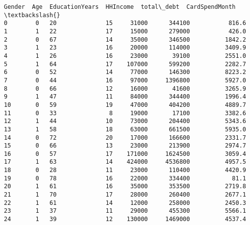 \documentclass[11pt]{article}
\begin{document}
    \begin{Verbatim}[commandchars=\\\{\}]
    Gender  Age  EducationYears  HHIncome  total\_debt  CardSpendMonth  \textbackslash{}
0        0   20              15     31000      344100           816.6
1        1   22              17     15000      279000           426.0
2        0   67              14     35000      346500          1842.2
3        1   23              16     20000      114000          3409.9
4        1   26              16     23000       39100          2551.0
5        1   64              17    107000      599200          2282.7
6        0   52              14     77000      146300          8223.2
7        0   44              16     97000     1396800          5927.0
8        0   66              12     16000       41600          3265.9
9        1   47              11     84000      344400          1996.4
10       0   59              19     47000      404200          4889.7
11       0   33               8     19000       17100          3382.6
12       1   44              10     73000      204400          5343.6
13       1   58              18     63000      661500          5935.0
14       0   72              20     17000      166600          2331.7
15       0   66              13     23000      213900          2974.7
16       0   57              17    171000     1624500          3059.4
17       1   63              14    424000     4536800          4957.5
18       0   28              11     23000      110400          4420.9
19       0   78              16     22000      334400            81.1
20       1   61              16     35000      353500          2719.8
21       1   70              17     28000      260400          2677.1
22       1   61              14     12000      258000          2450.3
23       1   37              11     29000      455300          5566.1
24       1   39              12    130000     1469000          4537.4


\end{Verbatim}
\end{document}
